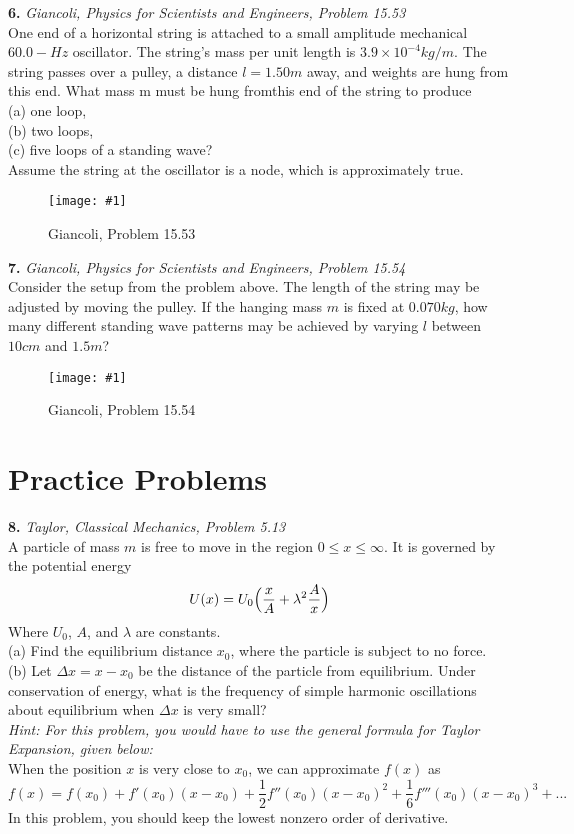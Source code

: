 \documentclass[11pt]{article}
\newcommand{\fig}[4]{
    \begin{figure}[H]
        \centering
        \texttt{[image: \#1]}
        \caption{#2}
        \label{exp4fit}
    \end{figure}
}
\theoremstyle{gangnamstyle}{\newtheorem{definition}{Definition}[]}
\theoremstyle{gangnamstyle}{\newtheorem{example}{Example}[]}
\theoremstyle{gangnamstyle}{\newtheorem{problem}{Problem}[]}
\begin{document}
\textbf{6.} \textit{Giancoli, Physics for Scientists and Engineers, Problem 15.53} \\
One end of a horizontal string is attached to a small amplitude mechanical $60.0-Hz$ oscillator. The string’s mass per unit length is $3.9 \times 10^{-4} kg/m$. The string passes over a pulley, a distance $l = 1.50 m$ away, and weights are hung from this end. What mass m must be hung fromthis end of the string to produce \\
(a) one loop, \\
(b) two loops, \\
(c) five loops of a standing wave? \\
Assume the string at the oscillator is a node, which is approximately true.

\fig{figs/0730/g.png}{Giancoli, Problem 15.53}{0.6}{0}

\pagebreak

\textbf{7.} \textit{Giancoli, Physics for Scientists and Engineers, Problem 15.54} \\
Consider the setup from the problem above. The length of the string may be adjusted by moving the pulley. If the hanging mass $m$ is fixed at $0.070 kg$, how many different standing wave patterns may be achieved by varying $l$ between $10 cm$ and $1.5 m$?

\fig{figs/0730/g.png}{Giancoli, Problem 15.54}{0.6}{0}

\pagebreak

\section{Practice Problems}

\textbf{8.} \textit{Taylor, Classical Mechanics, Problem 5.13} \\
A particle of mass $m$ is free to move in the region $0 \leq x \leq \infty$. It is governed by the potential energy
\[ U(x) = U_0\Bigl(\frac{x}{A} + \lambda^2\frac{A}{x}\Bigr) \]
Where $U_0$, $A$, and $\lambda$ are constants. \\
(a) Find the equilibrium distance $x_0$, where the particle is subject to no force. \\
(b) Let $\Delta x = x - x_0$ be the distance of the particle from equilibrium. Under conservation of energy, what is the frequency of simple harmonic oscillations about equilibrium when $\Delta x$ is very small? \\

\textit{Hint: For this problem, you would have to use the general formula for Taylor Expansion, given below:} \\
When the position $x$ is very close to $x_0$, we can approximate $f(x)$ as
\[ f(x) = f(x_0) + f'(x_0)(x - x_0) + \frac{1}{2} f''(x_0)(x - x_0)^2 + \frac{1}{6}f'''(x_0)(x - x_0)^3 + ... \]
In this problem, you should keep the lowest nonzero order of derivative. 

\pagebreak
\end{document}
